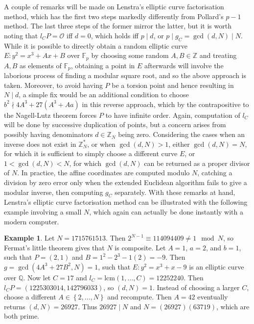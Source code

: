 \documentclass{article}
\newcommand{\F}{\mathbb{F}}
\newcommand{\Z}{\mathbb{Z}}
\newcommand{\Q}{\mathbb{Q}}
\newcommand{\rb}[1]{\left( #1 \right)}
\newcommand{\cb}[1]{\left\{ #1 \right\}}
\theoremstyle{definition}\newtheorem*{definition}{Definition}
\theoremstyle{definition}\newtheorem*{example}{Example}
\theoremstyle{definition}\newtheorem*{remark}{Remark}
\begin{document}
A couple of remarks will be made on Lenstra's elliptic curve factorisation method, which has the first two steps markedly differently from Pollard's $ p - 1 $ method. The last three steps of the former mirror the latter, but it is worth noting that $ l_CP = \mathcal{O} $ iff $ d = 0 $, which holds iff $ p \mid d $, or $ p \mid g_C = \gcd\rb{d, N} \mid N $. While it is possible to directly obtain a random elliptic curve $ E : y^2 = x^3 + Ax + B $ over $ \F_p $ by choosing some random $ A, B \in \Z $ and treating $ A, B $ as elements of $ \F_p $, obtaining a point in $ E $ afterwards will involve the laborious process of finding a modular square root, and so the above approach is taken. Moreover, to avoid having $ P $ be a torsion point and hence resulting in $ N \mid d $, a simple fix would be an additional condition to choose $ b^2 \nmid 4A^3 + 27\rb{A^3 + Aa} $ in this reverse approach, which by the contrapositive to the Nagell-Lutz theorem forces $ P $ to have infinite order. Again, computation of $ l_C $ will be done by successive duplication of points, but a concern arises from possibly having denominators $ d \in \Z_N $ being zero. Considering the cases when an inverse does not exist in $ \Z_N^* $, or when $ \gcd\rb{d, N} > 1 $, either $ \gcd\rb{d, N} = N $, for which it is sufficient to simply choose a different curve $ E $, or $ 1 < \gcd\rb{d, N} < N $, for which $ \gcd\rb{d, N} $ can be returned as a proper divisor of $ N $. In practice, the affine coordinates are computed modulo $ N $, catching a division by zero error only when the extended Euclidean algorithm fails to give a modular inverse, then computing $ g_C $ separately. With these remarks at hand, Lenstra's elliptic curve factorisation method can be illustrated with the following example involving a small $ N $, which again can actually be done instantly with a modern computer.

\begin{example}
Let $ N = 1715761513 $. Then $ 2^{N - 1} \equiv 114094409 \ne 1 \mod N $, so Fermat's little theorem gives that $ N $ is composite. Let $ A = 1 $, $ a = 2 $, and $ b = 1 $, such that $ P = \rb{2, 1} $ and $ B = 1^2 - 2^3 - 1\rb{2} = -9 $. Then $ g = \gcd\rb{4A^3 + 27B^2, N} = 1 $, such that $ E : y^2 = x^3 + x - 9 $ is an elliptic curve over $ \Q $. Now let $ C = 17 $ and $ l_C = \text{lcm}\rb{1, \dots, C} = 12252240 $. Then $ l_CP = \rb{1225303014, 142796033} $, so $ \rb{d, N} = 1 $. Instead of choosing a larger $ C $, choose a different $ A \in \cb{2, \dots, N} $ and recompute. Then $ A = 42 $ eventually returns $ \rb{d, N} = 26927 $. Thus $ 26927 \mid N $ and $ N = \rb{26927}\rb{63719} $, which are both prime.
\end{example}
\end{document}
